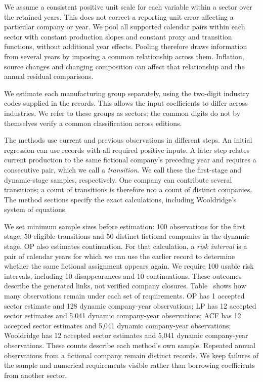 We assume a consistent positive unit scale for each variable within a sector over the retained years. This does not correct a reporting-unit error affecting a particular company or year. We pool all supported calendar pairs within each sector with constant production slopes and constant proxy and transition functions, without additional year effects. Pooling therefore draws information from several years by imposing a common relationship across them. Inflation, source changes and changing composition can affect that relationship and the annual residual comparisons.

We estimate each manufacturing group separately, using the two-digit industry codes supplied in the records. This allows the input coefficients to differ across industries. We refer to these groups as sectors; the common digits do not by themselves verify a common classification across editions.

The methods use current and previous observations in different steps. An initial regression can use records with all required positive inputs. A later step relates current production to the same fictional company's preceding year and requires a consecutive pair, which we call a \emph{transition}. We call these the first-stage and dynamic-stage samples, respectively. One company can contribute several transitions; a count of transitions is therefore not a count of distinct companies. The method sections specify the exact calculations, including Wooldridge's system of equations.

We set minimum sample sizes before estimation: 100 observations for the first stage, 50 eligible transitions and 50 distinct fictional companies in the dynamic stage. OP also estimates continuation. For that calculation, a \emph{risk interval} is a pair of calendar years for which we can use the earlier record to determine whether the same fictional assignment appears again. We require 100 usable risk intervals, including 10 disappearances and 10 continuations. These outcomes describe the generated links, not verified company closures. Table~ shows how many observations remain under each set of requirements.
OP has 1 accepted sector estimate and 128 dynamic company-year observations; LP has 12 accepted sector estimates and 5,041 dynamic company-year observations; ACF has 12 accepted sector estimates and 5,041 dynamic company-year observations; Wooldridge has 12 accepted sector estimates and 5,041 dynamic company-year observations. These counts describe each method's own sample. Repeated annual observations from a fictional company remain distinct records. We keep failures of the sample and numerical requirements visible rather than borrowing coefficients from another sector.

